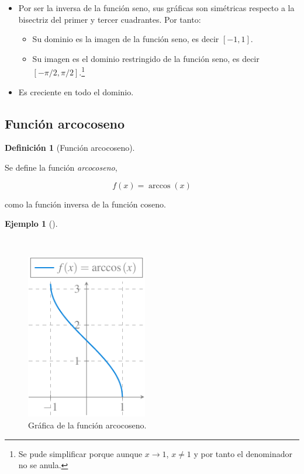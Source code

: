 \documentclass[
  a4paper,
]{scrreport}
\providecommand{\tightlist}{%
  \setlength{\itemsep}{0pt}\setlength{\parskip}{0pt}}\usepackage{longtable,booktabs,array}
\theoremstyle{definition}
\newtheorem{example}{Ejemplo}[chapter]
\theoremstyle{plain}
\theoremstyle{definition}
\newtheorem{definition}{Definición}[chapter]
\theoremstyle{definition}
\theoremstyle{plain}
\theoremstyle{plain}
\theoremstyle{remark}
\begin{document}
\begin{itemize}
\tightlist
\item
  Por ser la inversa de la función seno, sus gráficas son simétricas
  respecto a la bisectriz del primer y tercer cuadrantes. Por tanto:

  \begin{itemize}
  \tightlist
  \item
    Su dominio es la imagen de la función seno, es decir \([-1,1]\).
  \item
    Su imagen es el dominio restringido de la función seno, es decir
    \([-\pi/2,\pi/2]\).\footnote{Se pude simplificar porque aunque
      \(x\to 1\), \(x\neq 1\) y por tanto el denominador no se anula.}
  \end{itemize}
\item
  Es creciente en todo el dominio.
\end{itemize}

\subsection{Función arcocoseno}\label{funciuxf3n-arcocoseno}

\begin{definition}[Función
arcocoseno]\protect\hypertarget{def-funcion-arcocoseno}{}\label{def-funcion-arcocoseno}

Se define la función \emph{arcocoseno},

\[f(x)=\operatorname{arccos}(x)\]

como la función inversa de la función coseno.

\end{definition}

\begin{example}[]\protect\hypertarget{exm-funcion-arcocoseno}{}\label{exm-funcion-arcocoseno}

~

\begin{figure}[H]

{\centering \includegraphics[width=2.08333in,height=\textheight]{./img/funciones/funcion-arcocoseno.pdf}

}

\caption{Gráfica de la función arcocoseno.}

\end{figure}%

\end{example}
\end{document}
